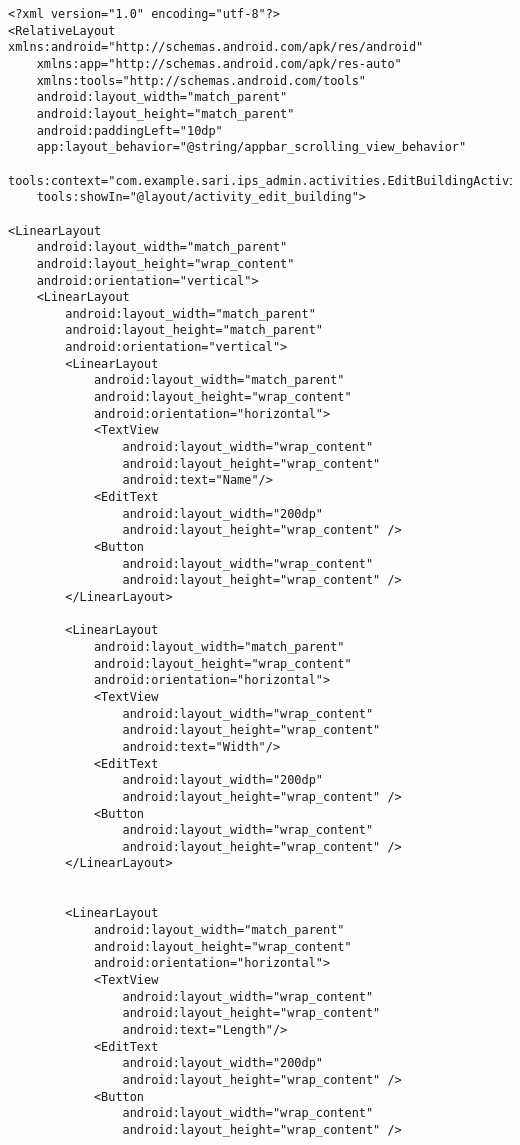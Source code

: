 \begin{lstlisting}<?xml version="1.0" encoding="utf-8"?>
<RelativeLayout xmlns:android="http://schemas.android.com/apk/res/android"
    xmlns:app="http://schemas.android.com/apk/res-auto"
    xmlns:tools="http://schemas.android.com/tools"
    android:layout_width="match_parent"
    android:layout_height="match_parent"
    android:paddingLeft="10dp"
    app:layout_behavior="@string/appbar_scrolling_view_behavior"
    tools:context="com.example.sari.ips_admin.activities.EditBuildingActivity"
    tools:showIn="@layout/activity_edit_building">

<LinearLayout
    android:layout_width="match_parent"
    android:layout_height="wrap_content"
    android:orientation="vertical">
    <LinearLayout
        android:layout_width="match_parent"
        android:layout_height="match_parent"
        android:orientation="vertical">
        <LinearLayout
            android:layout_width="match_parent"
            android:layout_height="wrap_content"
            android:orientation="horizontal">
            <TextView
                android:layout_width="wrap_content"
                android:layout_height="wrap_content"
                android:text="Name"/>
            <EditText
                android:layout_width="200dp"
                android:layout_height="wrap_content" />
            <Button
                android:layout_width="wrap_content"
                android:layout_height="wrap_content" />
        </LinearLayout>

        <LinearLayout
            android:layout_width="match_parent"
            android:layout_height="wrap_content"
            android:orientation="horizontal">
            <TextView
                android:layout_width="wrap_content"
                android:layout_height="wrap_content"
                android:text="Width"/>
            <EditText
                android:layout_width="200dp"
                android:layout_height="wrap_content" />
            <Button
                android:layout_width="wrap_content"
                android:layout_height="wrap_content" />
        </LinearLayout>


        <LinearLayout
            android:layout_width="match_parent"
            android:layout_height="wrap_content"
            android:orientation="horizontal">
            <TextView
                android:layout_width="wrap_content"
                android:layout_height="wrap_content"
                android:text="Length"/>
            <EditText
                android:layout_width="200dp"
                android:layout_height="wrap_content" />
            <Button
                android:layout_width="wrap_content"
                android:layout_height="wrap_content" />


\end{lstlisting}
